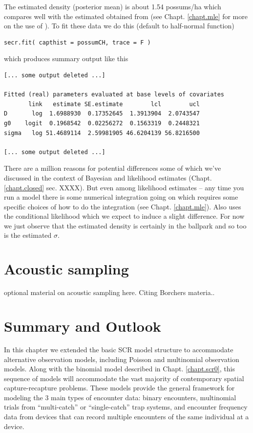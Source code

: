 The estimated density (posterior mean) is about 1.54 possums/ha which
compares well with the estimated obtained from \secr (see
Chapt. \ref{chapt.mle} for more on the use of \secr).
To fit these data we do this (default to half-normal function)
\begin{verbatim}
secr.fit( capthist = possumCH, trace = F )
\end{verbatim}
which produces summary output like this
\begin{verbatim}
[... some output deleted ...]

Fitted (real) parameters evaluated at base levels of covariates
       link   estimate SE.estimate        lcl        ucl
D       log  1.6988930  0.17352645  1.3913904  2.0743547
g0    logit  0.1968542  0.02256272  0.1563319  0.2448321
sigma   log 51.4689114  2.59981905 46.6204139 56.8216500

[... some output deleted ...]
\end{verbatim}
There are a million reasons for potential differences some of which
we've discussed in the context of Bayesian and likelihood estimates
(Chapt. \ref{chapt.closed} sec. XXXX).
But even among likelihood estimates -- any time you run a model there
is some numerical integration going on which requires some specific
choices of how to do the integration (see
Chapt. \ref{chapt.mle}). Also \secr uses the conditional likelihood
\citep{borchers_efford:2008} which we expect to induce a slight
difference.
For now we just observe that the estimated density is certainly in the
ballpark and so too is the estimated $\sigma$.


\section{Acoustic sampling}

optional material on acoustic sampling here. Citing Borchers
materia.. 



\section{Summary and Outlook}

In this chapter we extended the basic SCR model structure to
accommodate alternative observation models, including Poisson and
multinomial observation models.  Along with the binomial model
described in Chapt. \ref{chapt.scr0}, this sequence of models will
accommodate the vast majority of contemporary spatial
capture-recapture problems. These models provide the general framework
for modeling the 3 main types of encounter data: binary encounters,
multinomial trials from ``multi-catch'' or ``single-catch''
\citep{efford:2004, efford:2011} trap systems, and encounter frequency
data from devices that can record multiple encounters of the same
individual at a device.

